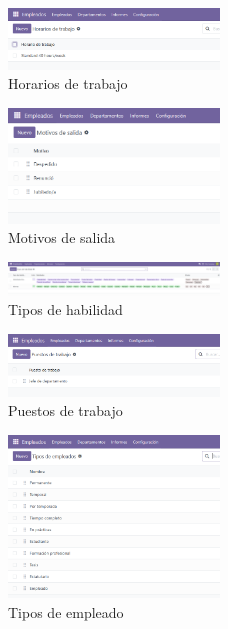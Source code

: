 \documentclass[a4paper,12pt]{article}
\begin{document}
\begin{figure}[h!]
    \centering
    \includegraphics[width=0.5\textwidth]{pr2odoo22-horarios.png}
    \caption{Horarios de trabajo}
\end{figure}
\FloatBarrier

\begin{figure}[h!]
    \centering
    \includegraphics[width=0.5\textwidth]{pr2odoo23-motivosSalida.png}
    \caption{Motivos de salida}
\end{figure}
\FloatBarrier

\begin{figure}[h!]
    \centering
    \includegraphics[width=0.5\textwidth]{pr2odoo24-tiposHabilidad.png}
    \caption{Tipos de habilidad}
\end{figure}
\FloatBarrier

\begin{figure}[h!]
    \centering
    \includegraphics[width=0.5\textwidth]{pr2odoo25-puestosTrabajo.png}
    \caption{Puestos de trabajo}
\end{figure}
\FloatBarrier

\begin{figure}[h!]
    \centering
    \includegraphics[width=0.5\textwidth]{pr2odoo26-tiposEmpleado.png}
    \caption{Tipos de empleado}
\end{figure}
\FloatBarrier
\end{document}
